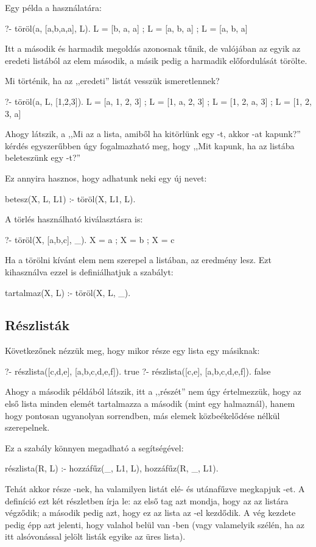 Egy példa a használatára:
\begin{query}
?- töröl(a, [a,b,a,a], L).
L = [b, a, a] ;
L = [a, b, a] ;
L = [a, b, a]
\end{query}
Itt a második és harmadik megoldás azonosnak tűnik,
de valójában az egyik az eredeti listából az 
elem második, a másik pedig a harmadik előfordulását
törölte.

Mi történik, ha az ,,eredeti'' listát vesszük
ismeretlennek?
\begin{query}
?- töröl(a, L, [1,2,3]).
L = [a, 1, 2, 3] ;
L = [1, a, 2, 3] ;
L = [1, 2, a, 3] ;
L = [1, 2, 3, a]
\end{query}
Ahogy látszik, a ,,Mi az a lista, amiből ha
kitörlünk egy -t, akkor \pr{[1,2,3]}-at
kapunk?'' kérdés egyszerűbben úgy fogalmazható meg,
hogy ,,Mit kapunk, ha az \pr{[1, 2, 3]} listába
beleteszünk egy -t?''

Ez annyira hasznos, hogy adhatunk neki egy új
nevet:
\begin{program}
betesz(X, L, L1) :- töröl(X, L1, L).
\end{program}

A törlés használható kiválasztásra is:
\begin{query}
?- töröl(X, [a,b,c], _).
X = a ;
X = b ;
X = c
\end{query}

Ha a törölni kívánt elem nem szerepel a listában, az
eredmény  lesz. Ezt kihasználva ezzel is
definiálhatjuk a  szabályt:
\begin{program}
tartalmaz(X, L) :- töröl(X, L, _).
\end{program}

\subsection*{Részlisták}
Következőnek nézzük meg, hogy mikor része egy lista
egy másiknak:
\begin{query}
?- részlista([c,d,e], [a,b,c,d,e,f]).
true
?- részlista([c,e], [a,b,c,d,e,f]).
false
\end{query}

Ahogy a második példából látszik, itt a ,,részét''
nem úgy értelmezzük, hogy az első lista minden
elemét tartalmazza a második (mint egy halmaznál),
hanem hogy pontosan ugyanolyan sorrendben, más
elemek közbeékelődése nélkül szerepelnek.

Ez a szabály könnyen megadható a 
segítségével:
\begin{program}
részlista(R, L) :-
    hozzáfűz(_, L1, L), hozzáfűz(R, _, L1).
\end{program}
Tehát  akkor része -nek, ha valamilyen
listát elé- és utánafűzve megkapjuk -et. A
definíció ezt két részletben írja le: az első tag
azt mondja, hogy az  az  listára
végződik; a második pedig azt, hogy ez az 
lista az -el kezdődik. A vég kezdete pedig épp
azt jelenti, hogy  valahol belül van
-ben (vagy valamelyik szélén, ha az itt
alsóvonással jelölt listák egyike az üres lista).

